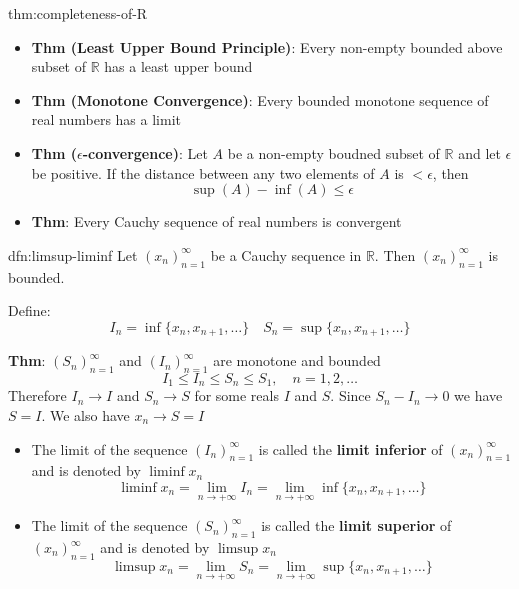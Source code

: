 \documentclass[landscape, 8pt]{extarticle}
\begin{document}
\begin{multicols}{3}
\begin{thm}{thm:completeness-of-R}{}
    \vspace{-5pt}
    \begin{itemize}[leftmargin=*]
        \item \textbf{Thm (Least Upper Bound Principle)}: Every non-empty bounded above subset of $\mathbb{R}$ has a least upper bound
        \item \textbf{Thm (Monotone Convergence)}: Every bounded monotone sequence of real numbers has a limit
        \item \textbf{Thm ($\epsilon$-convergence)}: Let $A$ be a non-empty boudned subset of $\mathbb{R}$ and let $\epsilon$ be positive. If the distance between any two elements of $A$ is $< \epsilon$, then
        \[\sup(A) - \inf(A) \le \epsilon\]
        \item \textbf{Thm}: Every Cauchy sequence of real numbers is convergent
    \end{itemize}
\end{thm}

\begin{dfn}{dfn:limsup-liminf}{}
    Let $(x_{n})^{\infty}_{n=1}$ be a Cauchy sequence in $\mathbb{R}$. Then $(x_{n})^{\infty}_{n=1}$ is bounded.

    Define:
    \[I_{n} = \inf \{x_{n}, x_{n+1},\dots\} \quad S_{n} = \sup \{x_{n}, x_{n+1},\dots\}\]

    \longrule{0.08ex}
    \textbf{Thm}: $(S_{n})^{\infty}_{n=1}$ and $(I_{n})^{\infty}_{n=1}$ are monotone and bounded
    \[I_{1} \le I_{n} \le S_{n} \le S_{1}, \quad n = 1,2,\dots\]
    Therefore $I_{n} \to I$ and $S_{n} \to S$ for some reals $I$ and $S$. Since $S_{n} - I_{n} \to 0$ we have $S = I$. We also have $x_{n}\to S = I$

    \vspace{-8pt}

    \begin{itemize}[leftmargin=*]
        \item The limit of the sequence $(I_{n})^{\infty}_{n=1}$ is called the \textbf{limit inferior} of $(x_{n})^{\infty}_{n=1}$ and is denoted by $\liminf x_{n}$
            \[\liminf x_{n} = \lim_{n\to +\infty} I_{n} = \lim_{n\to +\infty} \inf \{x_{n}, x_{n+1},\dots\}\]
        \item The limit of the sequence $(S_{n})^{\infty}_{n=1}$ is called the \textbf{limit superior} of $(x_{n})^{\infty}_{n=1}$ and is denoted by $\limsup x_{n}$
            \[\limsup x_{n} = \lim_{n\to +\infty} S_{n} = \lim_{n\to +\infty} \sup \{x_{n}, x_{n+1},\dots\}\]
    \end{itemize}


\end{dfn}
\end{multicols}
\end{document}
